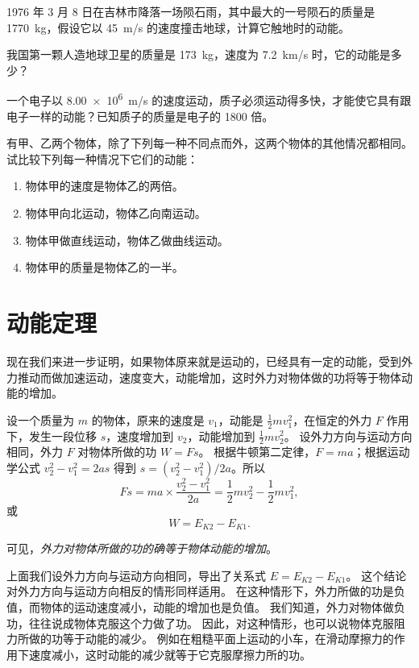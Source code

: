\begin{Practice}
\begin{question}
  \item 1976 年 3 月 8 日在吉林市降落一场陨石雨，其中最大的一号陨石的质量是 \qty{1770}{kg}，假设它以 \qty{45}{m/s} 的速度撞击地球，计算它触地时的动能。
  \item 我国第一颗人造地球卫星的质量是 \qty{173}{kg}，速度为 \qty{7.2}{km/s} 时，它的动能是多少？
  \item 一个电子以 \qty{8.00e6}{m/s} 的速度运动，质子必须运动得多快，才能使它具有跟电子一样的动能？已知质子的质量是电子的 1800 倍。
  \item 有甲、乙两个物体，除了下列每一种不同点而外，这两个物体的其他情况都相同。试比较下列每一种情况下它们的动能：
  \begin{enumerate}
    \item 物体甲的速度是物体乙的两倍。
    \item 物体甲向北运动，物体乙向南运动。
    \item 物体甲做直线运动，物体乙做曲线运动。
    \item 物体甲的质量是物体乙的一半。
  \end{enumerate}
\end{question}
\end{Practice}

\section{动能定理}
现在我们来进一步证明，如果物体原来就是运动的，已经具有一定的动能，受到外力推动而做加速运动，速度变大，动能增加，这时外力对物体做的功将等于物体动能的增加。

设一个质量为 $m$ 的物体，原来的速度是 $v_1$，动能是 $\frac{1}{2}mv^2_1$，在恒定的外力 $F$ 作用下，发生一段位移 $s$，速度增加到 $v_2$，动能增加到 $\frac{1}{2}mv^2_2$。
设外力方向与运动方向相同，外力 $F$ 对物体所做的功 $W=Fs$。
根据牛顿第二定律，$F=ma$；根据运动学公式 $v^2_2-v^2_1=2as$ 得到 $s=(v^2_2-v^2_1)/2a$。所以
\[Fs=ma\times \frac{v^2_2-v^2_1}{2a}=\frac{1}{2}mv^2_2-\frac{1}{2}mv^2_1, \]
或
\[W=E_{K2}-E_{K1}.\]

可见，\emph{外力对物体所做的功的确等于物体动能的增加}。

上面我们设外力方向与运动方向相同，导出了关系式 $E=E_{K2}-E_{K1}$。
这个结论对外力方向与运动方向相反的情形同样适用。
在这种情形下，外力所做的功是负值，而物体的运动速度减小，动能的增加也是负值。
我们知道，外力对物体做负功，往往说成物体克服这个力做了功。
因此，对这种情形，也可以说物体克服阻力所做的功等于动能的减少。
例如在粗糙平面上运动的小车，在滑动摩擦力的作用下速度减小，这时动能的减少就等于它克服摩擦力所的功。
	

